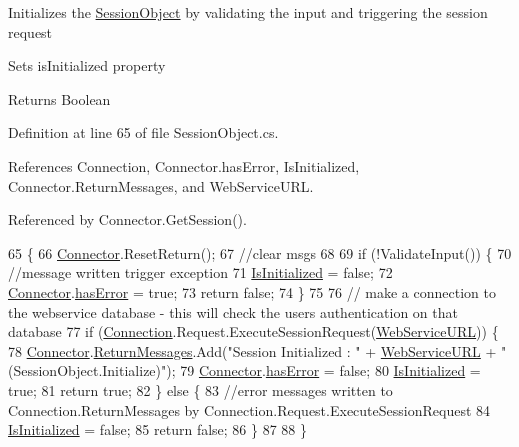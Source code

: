 Initializes the \mbox{\hyperlink{class_session_object}{Session\+Object}} by validating the input and triggering the session request 

Sets is\+Initialized property

\begin{DoxyReturn}{Returns}
Boolean
\end{DoxyReturn}


Definition at line 65 of file Session\+Object.\+cs.



References Connection, Connector.\+has\+Error, Is\+Initialized, Connector.\+Return\+Messages, and Web\+Service\+U\+RL.



Referenced by Connector.\+Get\+Session().


\begin{DoxyCode}
65                              \{
66         \mbox{\hyperlink{class_connector}{Connector}}.ResetReturn();
67         \textcolor{comment}{//clear msgs}
68 
69         \textcolor{keywordflow}{if} (!ValidateInput()) \{
70             \textcolor{comment}{//message written trigger exception}
71             \mbox{\hyperlink{class_session_object_ae0885b9054fc3ce287307ac16ff69990}{IsInitialized}} = \textcolor{keyword}{false};
72             \mbox{\hyperlink{class_connector}{Connector}}.\mbox{\hyperlink{class_connector_a079bae21a5417efa53bfe8954c0f533f}{hasError}} = \textcolor{keyword}{true};
73             \textcolor{keywordflow}{return} \textcolor{keyword}{false};
74         \}
75 
76         \textcolor{comment}{// make a connection to the webservice database - this will check the users authentication on that
       database}
77         \textcolor{keywordflow}{if} (\mbox{\hyperlink{class_session_object_a014bdbf705a753540e19bfb53030c55c}{Connection}}.Request.ExecuteSessionRequest(\mbox{\hyperlink{class_session_object_a697c071c812fbf7ad1166b896fb44c16}{WebServiceURL}})) \{
78             \mbox{\hyperlink{class_connector}{Connector}}.\mbox{\hyperlink{class_connector_a1ed422674b344524fd77998dcf6a9ba6}{ReturnMessages}}.Add(\textcolor{stringliteral}{"Session Initialized : "} + 
      \mbox{\hyperlink{class_session_object_a697c071c812fbf7ad1166b896fb44c16}{WebServiceURL}} + \textcolor{stringliteral}{" (SessionObject.Initialize)"});
79             \mbox{\hyperlink{class_connector}{Connector}}.\mbox{\hyperlink{class_connector_a079bae21a5417efa53bfe8954c0f533f}{hasError}} = \textcolor{keyword}{false};
80             \mbox{\hyperlink{class_session_object_ae0885b9054fc3ce287307ac16ff69990}{IsInitialized}} = \textcolor{keyword}{true};
81             \textcolor{keywordflow}{return} \textcolor{keyword}{true};
82         \} \textcolor{keywordflow}{else} \{
83             \textcolor{comment}{//error messages written to Connection.ReturnMessages by
       Connection.Request.ExecuteSessionRequest}
84             \mbox{\hyperlink{class_session_object_ae0885b9054fc3ce287307ac16ff69990}{IsInitialized}} = \textcolor{keyword}{false};
85             \textcolor{keywordflow}{return} \textcolor{keyword}{false};
86         \}
87 
88     \}
\end{DoxyCode}


